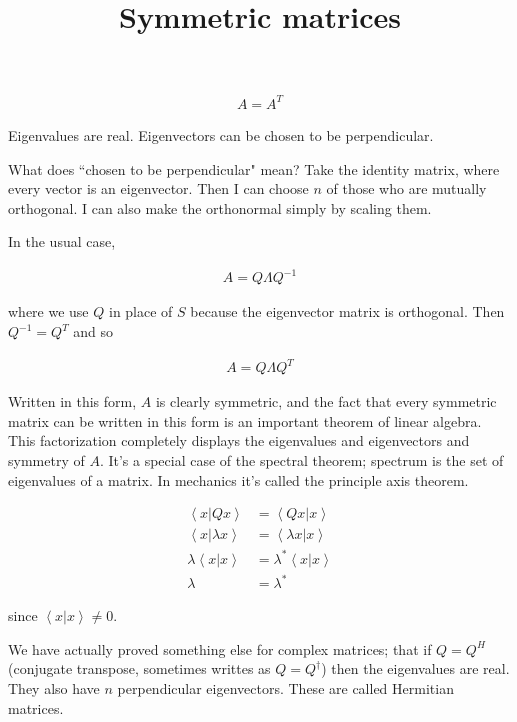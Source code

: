 \documentclass{article}
\title{Symmetric matrices}
\date{}
\begin{document}
\maketitle

\begin{align}
A = A^T
\end{align}

Eigenvalues are real. Eigenvectors can be chosen to be perpendicular.

What does ``chosen to be perpendicular" mean? Take the identity matrix, where every vector is an eigenvector. Then I can choose $n$ of those who are mutually orthogonal. I can also make the orthonormal simply by scaling them.

In the usual case,

\begin{align}
A = Q \Lambda Q^{-1}
\end{align}

where we use $Q$ in place of $S$ because the eigenvector matrix is orthogonal. Then $Q^{-1} = Q^T$ and so

\begin{align}
A = Q \Lambda Q^T
\end{align}

Written in this form, $A$ is clearly symmetric, and the fact that every symmetric matrix can be written in this form is an important theorem of linear algebra. This factorization completely displays the eigenvalues and eigenvectors and symmetry of $A$. It's a special case of the spectral theorem; spectrum is the set of eigenvalues of a matrix. In mechanics it's called the principle axis theorem.

\begin{align}
\left< x | Q x\right> &= \left<Q x | x\right> \\
\left< x | \lambda x\right> &= \left<\lambda x | x\right> \\
\lambda \left< x | x\right> &= \lambda^* \left< x | x\right> \\
\lambda &= \lambda^*
\end{align}

since $\left< x | x\right> \neq 0$.

We have actually proved something else for complex matrices; that if $Q = Q^{H}$ (conjugate transpose, sometimes writtes as $Q = Q^{\dagger}$) then the eigenvalues are real. They also have $n$ perpendicular eigenvectors. These are called Hermitian matrices. 
\end{document}
